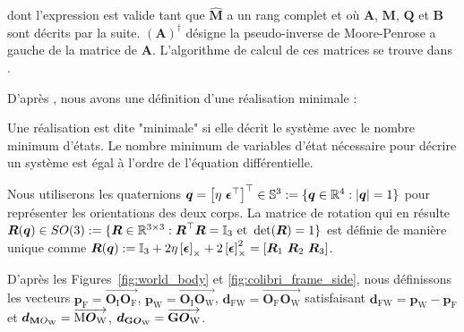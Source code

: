 dont l'expression est valide tant que $\hat{\boldsymbol{M}}$ a un rang complet et où $\boldsymbol{A}$, $\boldsymbol{M}$, $\boldsymbol{Q}$ et $\boldsymbol{B}$ sont décrits par la suite. $(\boldsymbol{A})^{\dag}$ désigne la pseudo-inverse de Moore-Penrose a gauche de la matrice de $\boldsymbol{A}$. L'algorithme de calcul de ces matrices se trouve dans \cite{udwadia-schutte}.

D'après \cite{Tangirala2015}, nous avons une définition d'une réalisation minimale : 
\begin{definition}
    \label{def:reaMini}
    Une réalisation est dite "minimale" si elle décrit le système avec le nombre minimum d'états. Le nombre minimum de variables d'état nécessaire pour décrire un système est égal à l'ordre de l'équation différentielle.
\end{definition}


Nous utiliserons les quaternions $\boldsymbol{q} = \left[ \eta ~ \boldsymbol{\epsilon}^\top \right]^\top  \in {\mathbb S}^3:=\{ \boldsymbol{q}\in {\mathbb R}^4: |\boldsymbol{q}| = 1\}$ pour représenter les orientations des deux corps. La matrice de rotation qui en résulte $\boldsymbol{R}(\boldsymbol{q}) \in SO(3): = \{\boldsymbol{R}\in {\mathbb R}^{3\times 3}: \boldsymbol{R}^\top \boldsymbol{R} = \mathbb{I}_{3} \text{ et}~\det(\boldsymbol{R})=1\}$ est définie de manière unique comme $\boldsymbol{R}(\boldsymbol{q}) := \mathbb{I}_{3} +2\eta \left[\boldsymbol{\epsilon}\right]_{\times} + 2\left[\boldsymbol{\epsilon}\right]_{\times}^{2} = [\boldsymbol{R}_{1}~\boldsymbol{R}_{2}~\boldsymbol{R}_{3}]$.


D'après les Figures~\ref{fig:world_body} et \ref{fig:colibri_frame_side}, nous définissons les vecteurs $\boldsymbol{p}_{\text{F}} = \overrightarrow{\boldsymbol{O}_{\text{I}} \boldsymbol{O}_{\text{F}}} $, $\boldsymbol{p}_{\text{W}} = \overrightarrow{\boldsymbol{O}_{\text{I}} \boldsymbol{O}_{\text{W}}} $, $\boldsymbol{d}_{\text{FW}} = \overrightarrow{\boldsymbol{O}_{\text{F}} \boldsymbol{O}_{\text{W}}} $ satisfaisant $\boldsymbol{d}_{\text{FW}} = \boldsymbol{p}_{\text{W}} - \boldsymbol{p}_{\text{F}}$ et $\boldsymbol{d}_{\text{\textbf{M}}O_{\text{W}}} = \overrightarrow{\text{M} \boldsymbol{O}_{\text{W}} }$, $\boldsymbol{d}_{\text{\textbf{G}}\boldsymbol{O}_{\text{W}}} = \overrightarrow{\text{\textbf{G}} \boldsymbol{O}_{\text{W}} }$.


